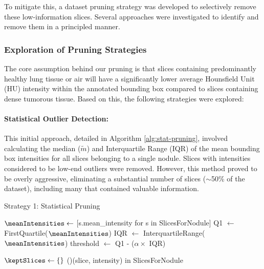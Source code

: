 To mitigate this, a dataset pruning strategy was developed to selectively remove these low-information slices. Several approaches were investigated to identify and remove them in a principled manner.

\subsubsection{Exploration of Pruning Strategies}
The core assumption behind our pruning is that slices containing predominantly healthy lung tissue or air will have a significantly lower average Hounsfield Unit (HU) intensity within the annotated bounding box compared to slices containing dense tumorous tissue. Based on this, the following strategies were explored:

\paragraph{Statistical Outlier Detection:} This initial approach, detailed in Algorithm \ref{alg:stat-pruning}, involved calculating the median ($\tilde{m}$) and Interquartile Range (IQR) of the mean bounding box intensities for all slices belonging to a single nodule. Slices with intensities considered to be low-end outliers were removed. However, this method proved to be overly aggressive, eliminating a substantial number of slices ($\sim$50\% of the dataset), including many that contained valuable information.

\begin{algorithm}[H]
    \caption{Strategy 1: Statistical Pruning}
    \label{alg:stat-pruning}
    \DontPrintSemicolon
    \SetAlgoLined

    
    \BlankLine
    
    $\meanIntensities \gets$ [s.mean\_intensity for s in SlicesForNodule]\;
    Q1 $\gets$ FirstQuartile($\meanIntensities$)\;
    IQR $\gets$ InterquartileRange($\meanIntensities$)\;
    threshold $\gets$ Q1 - ($\alpha \times$ IQR)\;
    
    \BlankLine
    $\keptSlices \gets \{\}$\;
    \ForAll(){(slice, intensity) \textup{in} SlicesForNodule}{
    }
    \Return{$\keptSlices$}\;
\end{algorithm}


